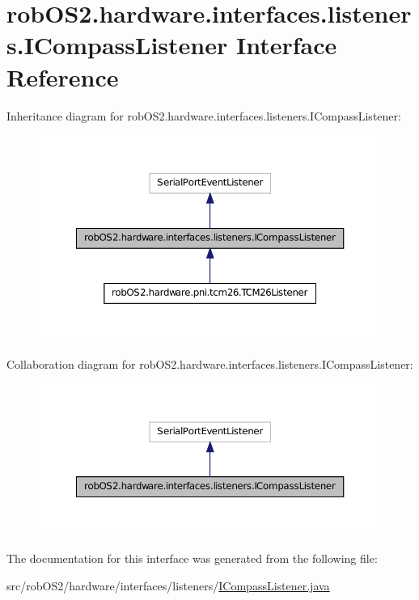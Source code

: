 \hypertarget{interfacerob_o_s2_1_1hardware_1_1interfaces_1_1listeners_1_1_i_compass_listener}{
\section{robOS2.hardware.interfaces.listeners.ICompassListener Interface Reference}
\label{interfacerob_o_s2_1_1hardware_1_1interfaces_1_1listeners_1_1_i_compass_listener}
}


Inheritance diagram for robOS2.hardware.interfaces.listeners.ICompassListener:\nopagebreak
\begin{figure}[H]
\begin{center}
\leavevmode
\includegraphics[width=362pt]{interfacerob_o_s2_1_1hardware_1_1interfaces_1_1listeners_1_1_i_compass_listener__inherit__graph}
\end{center}
\end{figure}


Collaboration diagram for robOS2.hardware.interfaces.listeners.ICompassListener:\nopagebreak
\begin{figure}[H]
\begin{center}
\leavevmode
\includegraphics[width=362pt]{interfacerob_o_s2_1_1hardware_1_1interfaces_1_1listeners_1_1_i_compass_listener__coll__graph}
\end{center}
\end{figure}


The documentation for this interface was generated from the following file:\begin{DoxyCompactItemize}
\item 
src/robOS2/hardware/interfaces/listeners/\hyperlink{_i_compass_listener_8java}{ICompassListener.java}\end{DoxyCompactItemize}
